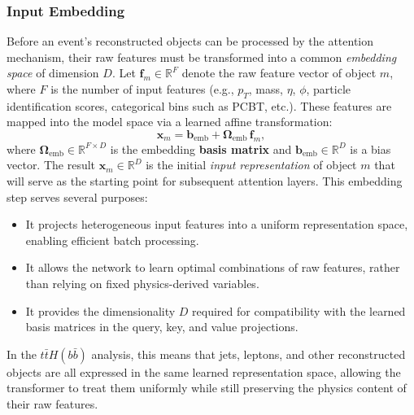 \subsubsection{Input Embedding}
Before an event's reconstructed objects can be processed by the attention mechanism, their raw features must be transformed into a common \emph{embedding space} of dimension $D$. Let $\mathbf{f}_m \in \mathbb{R}^F$ denote the raw feature vector of object $m$, where $F$ is the number of input features (e.g., $p_T$, mass, $\eta$, $\phi$, particle identification scores, categorical bins such as PCBT, etc.). These features are mapped into the model space via a learned affine transformation:
\begin{equation}
\mathbf{x}_m = \mathbf{b}_{\text{emb}} + \mathbf{\Omega}_{\text{emb}} \, \mathbf{f}_m,
\end{equation}
where $\mathbf{\Omega}_{\text{emb}} \in \mathbb{R}^{F \times D}$ is the embedding \textbf{basis matrix} and $\mathbf{b}_{\text{emb}} \in \mathbb{R}^D$ is a bias vector. 
The result $\mathbf{x}_m \in \mathbb{R}^D$ is the initial \emph{input representation} of object $m$ that will serve as the starting point for subsequent attention layers. This embedding step serves several purposes:
\begin{itemize}
    \item It projects heterogeneous input features into a uniform representation space, enabling efficient batch processing.
    \item It allows the network to learn optimal combinations of raw features, rather than relying on fixed physics-derived variables.
    \item It provides the dimensionality $D$ required for compatibility with the learned basis matrices in the query, key, and value projections.
\end{itemize}
In the $t\bar{t}H(b\bar{b})$ analysis, this means that jets, leptons, and other reconstructed objects are all expressed in the same learned representation space, allowing the transformer to treat them uniformly while still preserving the physics content of their raw features.

